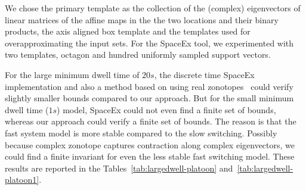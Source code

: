   We chose the primary template
as the collection of the (complex) eigenvectors of linear matrices of
the affine maps in the the two locations and their binary products,
the axis aligned box template and the templates used for
overapproximating the input sets. For the SpaceEx tool, we
experimented with two templates, octagon and hundred uniformly sampled
support vectors.

  For the large minimum dwell time of $20s$, the
discrete time SpaceEx implementation and also a method based on using
real zonotopes~\cite{makhlouf2014networked} could verify slightly
smaller bounds compared to our approach.  But for the small minimum
dwell time ($1s$) model, SpaceEx could not even find a finite set of
bounds, whereas our approach could verify a finite set of bounds.  The
reason is that the fast system model is more stable compared to the
slow switching.  Possibly because complex zonotope captures
contraction along complex eigenvectors, we could find a finite
invariant for even the less stable fast switching model.  These
results are reported in the Tables~\ref{tab:largedwell-platoon}
and~\ref{tab:largedwell-platoon1}.
%
